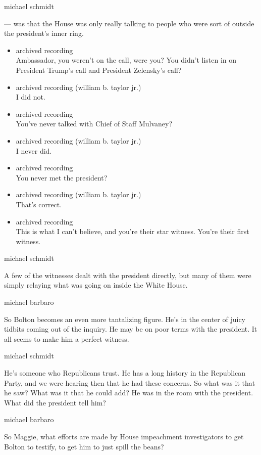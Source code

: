 michael schmidt

--- was that the House was only really talking to people who were sort
of outside the president's inner ring.

\begin{itemize}
\item
  archived recording\\
  Ambassador, you weren't on the call, were you? You didn't listen in on
  President Trump's call and President Zelensky's call?
\item
  archived recording (william b. taylor jr.)\\
  I did not.
\item
  archived recording\\
  You've never talked with Chief of Staff Mulvaney?
\item
  archived recording (william b. taylor jr.)\\
  I never did.
\item
  archived recording\\
  You never met the president?
\item
  archived recording (william b. taylor jr.)\\
  That's correct.
\item
  archived recording\\
  This is what I can't believe, and you're their star witness. You're
  their first witness.
\end{itemize}

michael schmidt

A few of the witnesses dealt with the president directly, but many of
them were simply relaying what was going on inside the White House.

michael barbaro

So Bolton becomes an even more tantalizing figure. He's in the center of
juicy tidbits coming out of the inquiry. He may be on poor terms with
the president. It all seems to make him a perfect witness.

michael schmidt

He's someone who Republicans trust. He has a long history in the
Republican Party, and we were hearing then that he had these concerns.
So what was it that he saw? What was it that he could add? He was in the
room with the president. What did the president tell him?

michael barbaro

So Maggie, what efforts are made by House impeachment investigators to
get Bolton to testify, to get him to just spill the beans?

